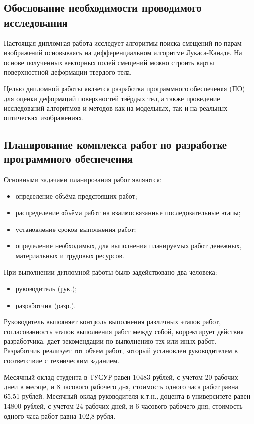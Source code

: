 \subsection{Обоснование необходимости проводимого исследования}
Настоящая дипломная работа исследует алгоритмы поиска смещений по парам изображений основываясь на дифференциальном алгоритме Лукаса-Канаде. На основе полученных векторных полей смещений можно строить карты поверхностной деформации твердого тела.

Целью дипломной работы является разработка программного обеспечения (ПО) для оценки деформаций поверхностей твёрдых тел, а также проведение исследований алгоритмов и методов как на модельных, так и на реальных оптических изображениях.

\subsection{Планирование комплекса работ по разработке программного обеспечения}
Основными задачами планирования работ являются:

\begin{itemize}
\item определение объёма предстоящих работ;
\item распределение объёма работ на взаимосвязанные последовательные этапы;
\end{itemize}

\begin{itemize}
\item установление сроков выполнения работ;
\item определение необходимых, для выполнения планируемых работ денежных, материальных и трудовых ресурсов.
\end{itemize}
При выполнении дипломной работы было задействовано два человека:

\begin{itemize}
\item руководитель (рук.);
\item разработчик (разр.).
\end{itemize}
Руководитель выполняет контроль выполнения различных этапов работ, согласованность этапов выполнения работ между собой, корректирует действия разработчика, дает рекомендации по выполнению тех или иных работ. Разработчик реализует тот объем работ, который установлен руководителем в соответствие с техническим заданием.

Месячный оклад студента в ТУСУР равен 10483 рублей, с учетом 20 рабочих дней в месяце, и 8 часового рабочего дня, стоимость одного часа работ равна 65,51 рублей. Месячный оклад руководителя к.т.н., доцента в университете равен 14800 рублей, с учетом 24 рабочих дней, и 6 часового рабочего дня, стоимость одного часа работ равна 102,8 рубля.

